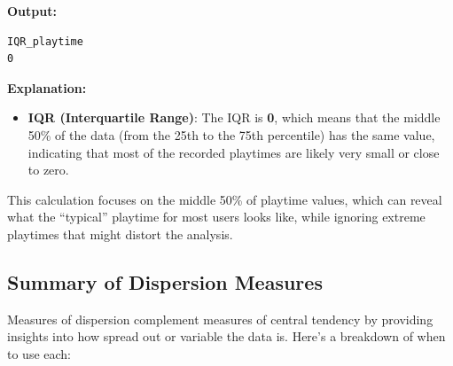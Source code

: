 \documentclass[
]{book}
\providecommand{\tightlist}{%
  \setlength{\itemsep}{0pt}\setlength{\parskip}{0pt}}
\begin{document}
\textbf{Output:}

\begin{verbatim}
IQR_playtime
0
\end{verbatim}

\textbf{Explanation:}

\begin{itemize}
\tightlist
\item
  \textbf{IQR (Interquartile Range)}: The IQR is \textbf{0}, which means that the middle 50\% of the data (from the 25th to the 75th percentile) has the same value, indicating that most of the recorded playtimes are likely very small or close to zero.
\end{itemize}

This calculation focuses on the middle 50\% of playtime values, which can reveal what the ``typical'' playtime for most users looks like, while ignoring extreme playtimes that might distort the analysis.

\subsection*{Summary of Dispersion Measures}\label{summary-of-dispersion-measures}

Measures of dispersion complement measures of central tendency by providing insights into how spread out or variable the data is. Here's a breakdown of when to use each:
\end{document}
